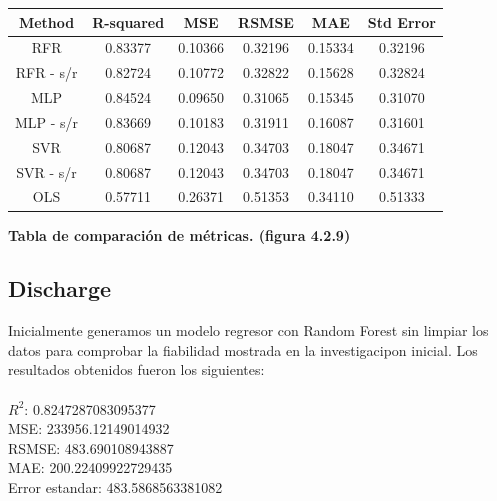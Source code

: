 \documentclass{article}
\begin{document}
        \begin{tabular}{|c|c|c|c|c|c|}
            \hline
            Method  &   R-squared  & MSE & RSMSE & MAE & Std Error  \\
            \hline
            RFR & 0.83377 & 0.10366 & 0.32196 & 0.15334 &  0.32196\\
            \hline
            RFR - s/r  & 0.82724 & 0.10772 & 0.32822 & 0.15628 &  0.32824\\
            \hline
            MLP & 0.84524 & 0.09650 & 0.31065 & 0.15345 & 0.31070 \\
            \hline
            MLP - s/r & 0.83669 & 0.10183 & 0.31911 & 0.16087 & 0.31601 \\
            \hline
            SVR & 0.80687 & 0.12043 & 0.34703 & 0.18047 & 0.34671 \\
            \hline
            SVR - s/r & 0.80687 & 0.12043 & 0.34703 & 0.18047 & 0.34671 \\
            \hline
            OLS & 0.57711 & 0.26371 & 0.51353 & 0.34110 & 0.51333 \\
            \hline
        \end{tabular}
        
        \begin{center}
                    \textbf{Tabla de comparación de métricas. (figura 4.2.9)}
        \end{center}



    \subsection{Discharge}
    
        Inicialmente generamos un modelo regresor con Random Forest sin limpiar los datos para comprobar la fiabilidad mostrada en la investigacipon inicial. Los resultados obtenidos fueron los siguientes:\\
        \\
        $R^2$:  0.8247287083095377\\
        MSE:  233956.12149014932\\
        RSMSE:  483.690108943887\\
        MAE:  200.22409922729435\\
        Error estandar:  483.5868563381082\\
    
\end{document}
